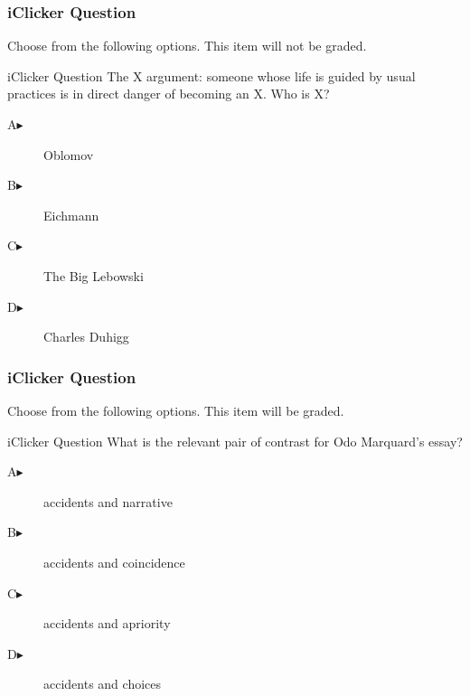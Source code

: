 \documentclass[xcolor=dvipsnames]{beamer}
\begin{document}
\begin{frame}
  \frametitle{iClicker Question}
Choose from the following options. This item will not be graded.
\begin{block}{iClicker Question}
The X argument: someone whose life is guided by usual practices is in
direct danger of becoming an X. Who is X?
\end{block}
\begin{description}
\item[A\hspace{.2in}$\blacktriangleright$] Oblomov
\item[B\hspace{.2in}$\blacktriangleright$] Eichmann
\item[C\hspace{.2in}$\blacktriangleright$] The Big Lebowski
\item[D\hspace{.2in}$\blacktriangleright$] Charles Duhigg
\end{description}
\end{frame}

\begin{frame}
  \frametitle{iClicker Question}
Choose from the following options. This item will be graded.
\begin{block}{iClicker Question}
What is the relevant pair of contrast for Odo Marquard's essay?
\end{block}
\begin{description}
\item[A\hspace{.2in}$\blacktriangleright$] accidents and narrative
\item[B\hspace{.2in}$\blacktriangleright$] accidents and coincidence
\item[C\hspace{.2in}$\blacktriangleright$] accidents and apriority
\item[D\hspace{.2in}$\blacktriangleright$] accidents and choices
\end{description}
\end{frame}
\end{document}
